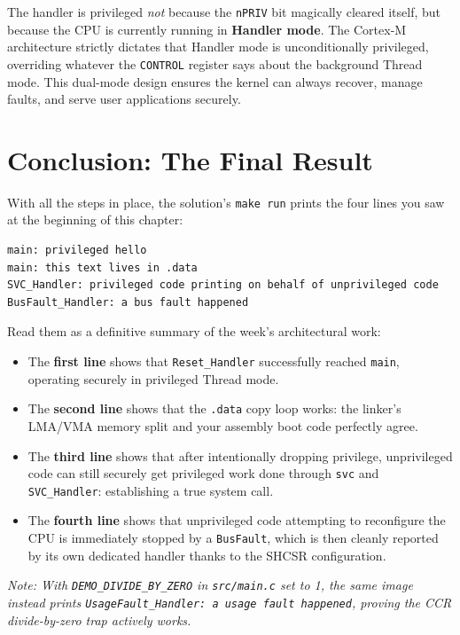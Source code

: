 The handler is privileged \textit{not} because the \texttt{nPRIV} bit magically cleared itself, but because the CPU is currently running in \textbf{Handler mode}. The Cortex-M architecture strictly dictates that Handler mode is unconditionally privileged, overriding whatever the \texttt{CONTROL} register says about the background Thread mode. This dual-mode design ensures the kernel can always recover, manage faults, and serve user applications securely.


\section{Conclusion: The Final Result}
With all the steps in place, the solution's \texttt{make run} prints the four lines you saw at the beginning of this chapter:

\begin{lstlisting}[language=bash]
main: privileged hello
main: this text lives in .data
SVC_Handler: privileged code printing on behalf of unprivileged code
BusFault_Handler: a bus fault happened
\end{lstlisting}

Read them as a definitive summary of the week's architectural work:
\begin{itemize}
    \item The \textbf{first line} shows that \texttt{Reset\_Handler} successfully reached \texttt{main}, operating securely in privileged Thread mode.
    \item The \textbf{second line} shows that the \texttt{.data} copy loop works: the linker's LMA/VMA memory split and your assembly boot code perfectly agree.
    \item The \textbf{third line} shows that after intentionally dropping privilege, unprivileged code can still securely get privileged work done through \texttt{svc} and \texttt{SVC\_Handler}: establishing a true system call.
    \item The \textbf{fourth line} shows that unprivileged code attempting to reconfigure the CPU is immediately stopped by a \texttt{BusFault}, which is then cleanly reported by its own dedicated handler thanks to the SHCSR configuration. 
\end{itemize}

\textit{Note: With \texttt{DEMO\_DIVIDE\_BY\_ZERO} in \texttt{src/main.c} set to 1, the same image instead prints \texttt{UsageFault\_Handler: a usage fault happened}, proving the CCR divide-by-zero trap actively works.}

